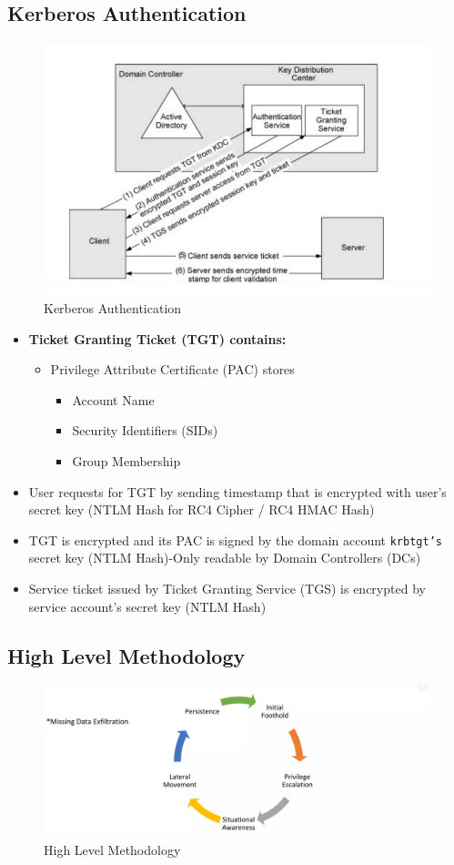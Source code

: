 \subsection{Kerberos Authentication}
\begin{figure}
    \centering
    \includegraphics[width=0.75\linewidth]{kerberosauth.png}
    \caption{Kerberos Authentication}
    \label{fig:placeholder}
\end{figure}
\begin{itemize}
    \item \textbf{Ticket Granting Ticket (TGT) contains:}
    \begin{itemize}
        \item Privilege Attribute Certificate (PAC) stores
        \begin{itemize}
            \item Account Name
            \item Security Identifiers (SIDs)
            \item Group Membership
        \end{itemize}
    \end{itemize}
\item User requests for TGT by sending timestamp that is encrypted with user's secret key (NTLM Hash for RC4 Cipher / RC4 HMAC Hash)
\item TGT is encrypted and its PAC is signed by the domain account \texttt{krbtgt's} secret key (NTLM Hash)-Only readable by Domain Controllers (DCs)
\item Service ticket issued by Ticket Granting Service (TGS) is encrypted by service account's secret key (NTLM Hash)
\end{itemize}

\subsection{High Level Methodology}
\begin{figure}
    \centering
    \includegraphics[width=0.75\linewidth]{highlevel.png}
    \caption{High Level Methodology}
    \label{fig:placeholder}
\end{figure}

